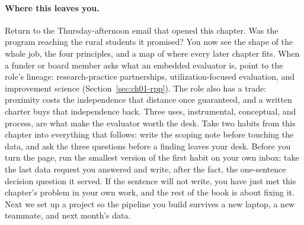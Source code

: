 \documentclass[
    a4paper,
    fontsize=10pt,
    twoside=true,
    numbers=noenddot,
]{kaobook}
\begin{document}
\paragraph{Where this leaves you.} Return to the Thursday-afternoon email that opened this chapter. Was the program reaching the rural students it promised? You now see the shape of the whole job, the four principles, and a map of where every later chapter fits. When a funder or board member asks what an embedded evaluator is, point to the role's lineage: research-practice partnerships, utilization-focused evaluation, and improvement science (Section~\ref{sec:ch01-rpp}). The role also has a trade: proximity costs the independence that distance once guaranteed, and a written charter buys that independence back. Three uses, instrumental, conceptual, and process, are what make the evaluator worth the desk. Take two habits from this chapter into everything that follows: write the scoping note before touching the data, and ask the three questions before a finding leaves your desk. Before you turn the page, run the smallest version of the first habit on your own inbox: take the last data request you answered and write, after the fact, the one-sentence decision question it served. If the sentence will not write, you have just met this chapter's problem in your own work, and the rest of the book is about fixing it. Next we set up a project so the pipeline you build survives a new laptop, a new teammate, and next month's data.
\end{document}
